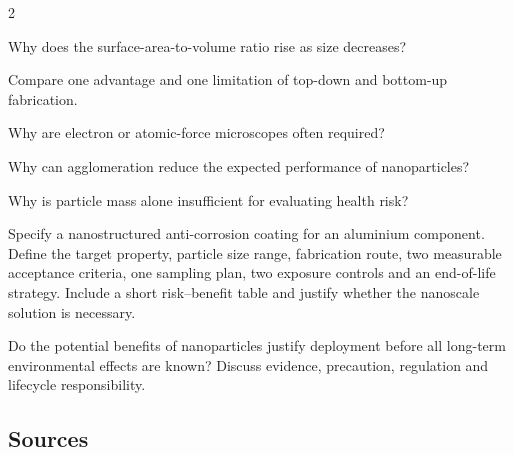 \begin{multicols}{2}
\begin{questions}
\item Why does the surface-area-to-volume ratio rise as size decreases?
\item Compare one advantage and one limitation of top-down and bottom-up fabrication.
\item Why are electron or atomic-force microscopes often required?
\item Why can agglomeration reduce the expected performance of nanoparticles?
\item Why is particle mass alone insufficient for evaluating health risk?
\end{questions}

\begin{engineeringchallenge}
Specify a nanostructured anti-corrosion coating for an aluminium component. Define the target property, particle
size range, fabrication route, two measurable acceptance criteria, one sampling plan, two exposure controls and an
end-of-life strategy. Include a short risk--benefit table and justify whether the nanoscale solution is necessary.
\end{engineeringchallenge}

\begin{speaking}
Do the potential benefits of nanoparticles justify deployment before all long-term environmental effects are
known? Discuss evidence, precaution, regulation and lifecycle responsibility.
\end{speaking}
\end{multicols}

\subsection*{Sources}
